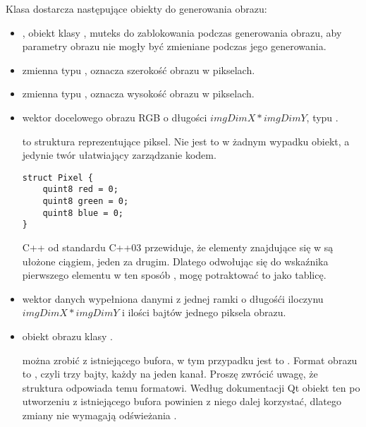 \label{sec:algorithm-pixmap-generate}

Klasa  dostarcza następujące obiekty do generowania obrazu:
\begin{itemize}
    \item {}, obiekt klasy , muteks do zablokowania podczas generowania obrazu, aby parametry obrazu nie mogły być zmieniane podczas jego generowania.

    \item {} zmienna typu , oznacza szerokość obrazu w pikselach.

    \item {} zmienna typu , oznacza wysokość obrazu w pikselach.

    \item {} wektor docelowego obrazu RGB o długości $imgDimX*imgDimY$, typu .

           to struktura reprezentujące piksel.
          Nie jest to w żadnym wypadku obiekt, a jedynie twór ułatwiający zarządzanie kodem.

          \begin{lstlisting}
struct Pixel {
    quint8 red = 0;   
    quint8 green = 0;    
    quint8 blue = 0;   
}\end{lstlisting}

        \par
        C++ od standardu C++03 przewiduje, że elementy znajdujące się w  są ułożone ciągiem, jeden za drugim.
        Dlatego odwołując się do wskaźnika pierwszego elementu w ten sposób , mogę potraktować to jako tablicę.

    \item {} wektor danych wypełniona danymi z jednej ramki o długośći iloczynu $imgDimX*imgDimY$ i ilości bajtów jednego piksela obrazu.

    \item {} obiekt obrazu klasy .

           można zrobić z istniejącego bufora, w tym przypadku jest to .
          Format obrazu to , czyli trzy bajty, każdy na jeden kanał.
          Proszę zwrócić uwagę, że struktura  odpowiada temu formatowi.
          Według dokumentacji Qt obiekt ten po utworzeniu z istniejącego bufora powinien z niego dalej korzystać, dlatego zmiany  nie wymagają odświeżania .


\end{itemize}
